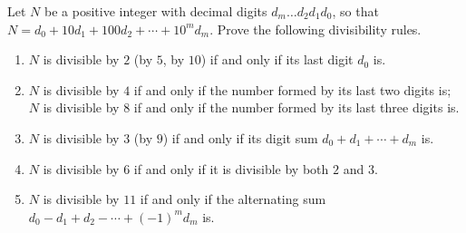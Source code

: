Let $N$ be a positive integer with decimal digits $d_m\ldots d_2d_1d_0$, so that $N=d_0+10d_1+100d_2+\cdots+10^md_m$. Prove the following divisibility rules.
\begin{enumerate}
\item[(a)] $N$ is divisible by $2$ (by $5$, by $10$) if and only if its last digit $d_0$ is.
\item[(b)] $N$ is divisible by $4$ if and only if the number formed by its last two digits is; $N$ is divisible by $8$ if and only if the number formed by its last three digits is.
\item[(c)] $N$ is divisible by $3$ (by $9$) if and only if its digit sum $d_0+d_1+\cdots+d_m$ is.
\item[(d)] $N$ is divisible by $6$ if and only if it is divisible by both $2$ and $3$.
\item[(e)] $N$ is divisible by $11$ if and only if the alternating sum $d_0-d_1+d_2-\cdots+(-1)^md_m$ is.
\end{enumerate}
